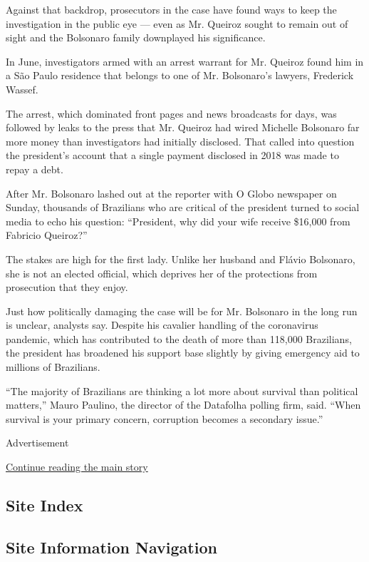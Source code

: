 Against that backdrop, prosecutors in the case have found ways to keep
the investigation in the public eye --- even as Mr. Queiroz sought to
remain out of sight and the Bolsonaro family downplayed his
significance.

In June, investigators armed with an arrest warrant for Mr. Queiroz
found him in a São Paulo residence that belongs to one of Mr.
Bolsonaro's lawyers, Frederick Wassef.

The arrest, which dominated front pages and news broadcasts for days,
was followed by leaks to the press that Mr. Queiroz had wired Michelle
Bolsonaro far more money than investigators had initially disclosed.
That called into question the president's account that a single payment
disclosed in 2018 was made to repay a debt.

After Mr. Bolsonaro lashed out at the reporter with O Globo newspaper on
Sunday, thousands of Brazilians who are critical of the president turned
to social media to echo his question: ``President, why did your wife
receive \$16,000 from Fabricio Queiroz?''

The stakes are high for the first lady. Unlike her husband and Flávio
Bolsonaro, she is not an elected official, which deprives her of the
protections from prosecution that they enjoy.

Just how politically damaging the case will be for Mr. Bolsonaro in the
long run is unclear, analysts say. Despite his cavalier handling of the
coronavirus pandemic, which has contributed to the death of more than
118,000 Brazilians, the president has broadened his support base
slightly by giving emergency aid to millions of Brazilians.

``The majority of Brazilians are thinking a lot more about survival than
political matters,'' Mauro Paulino, the director of the Datafolha
polling firm, said. ``When survival is your primary concern, corruption
becomes a secondary issue.''

Advertisement

\protect\hyperlink{after-bottom}{Continue reading the main story}

\hypertarget{site-index}{%
\subsection{Site Index}\label{site-index}}

\hypertarget{site-information-navigation}{%
\subsection{Site Information
Navigation}\label{site-information-navigation}}


